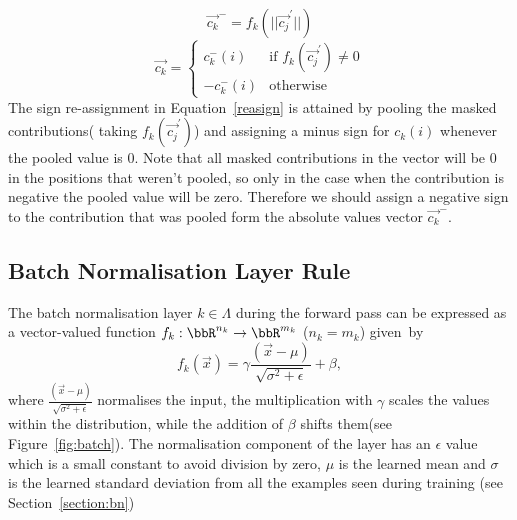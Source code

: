 \begin{equation}
    \label{pool}
    \vec{c_{k}}^- = f_{k}(||\vec{c_j}^\prime||)
\end{equation}
\begin{equation}
    \label{reasign}
    \vec{c_{k}} = \begin{cases}
    c_{k}^-(i) & \mbox{if $f_{k}(\vec{c_j}^\prime)\not=0$}\\
    - c_{k}^-(i)& \mbox{otherwise}
    \end{cases}
\end{equation}
The sign re-assignment in Equation~\ref{reasign} is attained by pooling the masked contributions( \ie taking $f_{k}(\vec{c_j}^\prime)$) and assigning a minus sign for $c_{k}(i)$ whenever the pooled value is 0. Note that all masked contributions in the vector will be 0 in the positions that weren't pooled, so only in the case when the contribution is negative the pooled value will be zero. Therefore we should assign a negative sign to the contribution that was pooled form the absolute values vector $\vec{c_{k}}^-$. 



\subsection{Batch Normalisation Layer Rule}
The batch normalisation layer $k\in \Lambda$ during the forward pass can be expressed as a vector-valued function $f_k:\bbR^{n_k}\to \bbR^{m_k}$ ($n_k=m_k$) given~by
\begin{equation}
    f_k(\vec{x}) = \gamma \frac{(\vec{x}-\mu)}{\sqrt{\sigma^2 +\epsilon}} + \beta ,
\end{equation}
where $\frac{(\vec{x}-\mu)}{\sqrt{\sigma^2 +\epsilon}}$ normalises the input, the multiplication with $\gamma$ scales the values within the distribution, while the addition of $\beta$ shifts them(see Figure~\ref{fig:batch}). The normalisation component of the layer has an $\epsilon$ value which is a small constant to avoid division by zero, $\mu$ is the learned mean and $\sigma$ is the learned standard deviation from all the examples seen during training (see Section~\ref{section:bn})


